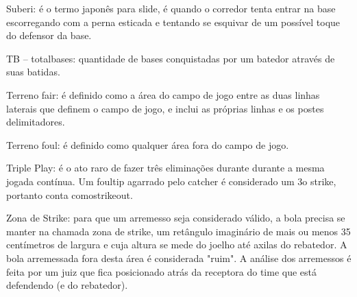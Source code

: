  Suberi: é o termo japonês para \gls{slide}, é quando o corredor tenta entrar na base escorregando com a perna esticada e tentando se esquivar de um possível toque do defensor da base.

 TB -- \glspl{totalbase}: quantidade de bases conquistadas por um batedor através de suas batidas.

 Terreno \gls{fair}: é definido como a área do campo de jogo entre as duas linhas laterais que definem o campo de jogo, e inclui as próprias linhas e os postes delimitadores.

 Terreno \gls{foul}: é definido como qualquer área fora do campo de jogo.

 Triple Play: é o ato raro de fazer três eliminações durante durante a mesma jogada contínua. Um \gls{foultip} agarrado pelo catcher é considerado um 3o strike, portanto conta como\gls{strikeout}.



 Zona de Strike: para que um arremesso seja considerado válido, a bola precisa se manter na chamada zona de strike, um retângulo imaginário de mais ou menos 35 centímetros de largura e cuja altura se mede do joelho até axilas do rebatedor. A bola arremessada fora desta área é considerada "ruim". A análise dos arremessos é feita por um juiz que fica posicionado atrás da receptora do time que está defendendo (e do rebatedor).
